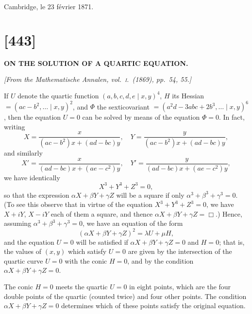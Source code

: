 \documentclass[11pt,a4paper]{article}
\begin{document}
Cambridge, le 23 f\'{e}vrier 1871.

\newpage
\section*{[443]}

\begin{center}
\textbf{\Large ON THE SOLUTION OF A QUARTIC EQUATION.}
\end{center}

\begin{flushright}
\textit{[From the \textit{Mathematische Annalen}, vol.\ \textsc{i}.\ (1869), pp.\ 54, 55.]}
\end{flushright}

\vspace{1em}

\noindent
If $U$ denote the quartic function $(a, b, c, d, e\mid x, y)^4$, $H$ its Hessian $= (ac - b^2, \ldots \mid x, y)^2$, and $\Phi$ the sexticovariant $= (a^2d - 3abc + 2b^3, \ldots \mid x, y)^6$, then the equation $U = 0$ can be solved by means of the equation $\Phi = 0$. In fact, writing
\[
X = \frac{x}{(ac - b^2)x + (ad - bc)y},\quad
Y = \frac{y}{(ac - b^2)x + (ad - bc)y},
\]
and similarly
\[
X' = \frac{x}{(ad - bc)x + (ae - c^2)y},\quad
Y' = \frac{y}{(ad - bc)x + (ae - c^2)y},
\]
we have identically
\[
X^3 + Y^3 + Z^3 = 0,
\]
so that the expression $\alpha X + \beta Y + \gamma Z$ will be a square if only $\alpha^3 + \beta^3 + \gamma^3 = 0$. (To see this observe that in virtue of the equation $X^3 + Y^3 + Z^3 = 0$, we have $X + iY$, $X - iY$ each of them a square, and thence $\alpha X + \beta Y + \gamma Z = \Box$.) Hence, assuming $\alpha^3 + \beta^3 + \gamma^3 = 0$, we have an equation of the form
\[
(\alpha X + \beta Y + \gamma Z)^2 = \lambda U + \mu H,
\]
and the equation $U = 0$ will be satisfied if $\alpha X + \beta Y + \gamma Z = 0$ and $H = 0$; that is, the values of $(x, y)$ which satisfy $U = 0$ are given by the intersection of the quartic curve $U = 0$ with the conic $H = 0$, and by the condition $\alpha X + \beta Y + \gamma Z = 0$.

The conic $H = 0$ meets the quartic $U = 0$ in eight points, which are the four double points of the quartic (counted twice) and four other points. The condition $\alpha X + \beta Y + \gamma Z = 0$ determines which of these points satisfy the original equation.
\end{document}
